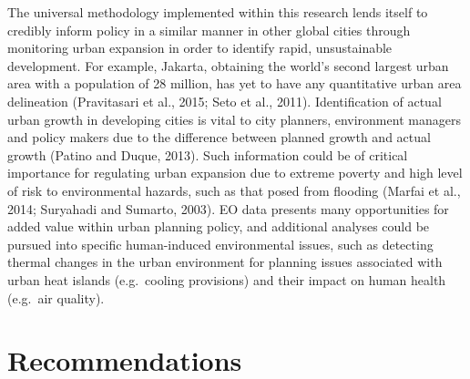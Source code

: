 \documentclass[]{book}
\begin{document}
The universal methodology implemented within this research lends itself
to credibly inform policy in a similar manner in other global cities
through monitoring urban expansion in order to identify rapid,
unsustainable development. For example, Jakarta, obtaining the world's
second largest urban area with a population of 28 million, has yet to
have any quantitative urban area delineation (Pravitasari et al., 2015;
Seto et al., 2011). Identification of actual urban growth in developing
cities is vital to city planners, environment managers and policy makers
due to the difference between planned growth and actual growth (Patino
and Duque, 2013). Such information could be of critical importance for
regulating urban expansion due to extreme poverty and high level of risk
to environmental hazards, such as that posed from flooding (Marfai et
al., 2014; Suryahadi and Sumarto, 2003). EO data presents many
opportunities for added value within urban planning policy, and
additional analyses could be pursued into specific human-induced
environmental issues, such as detecting thermal changes in the urban
environment for planning issues associated with urban heat islands
(e.g.~cooling provisions) and their impact on human health (e.g.~air
quality).

\section{Recommendations}\label{recommendations}
\end{document}

